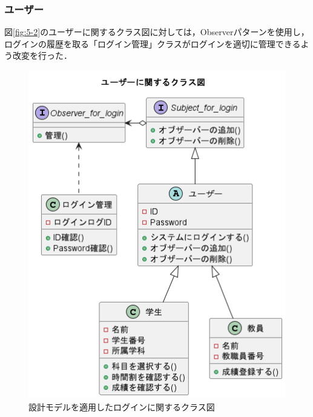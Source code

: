 \documentclass[documentclass]{jsarticle}
\begin{document}
\subsubsection*{ユーザー}
図\ref*{fig:5-2}のユーザーに関するクラス図に対しては，Observerパターンを使用し，ログインの履歴を取る「ログイン管理」クラスがログインを適切に管理できるよう改変を行った．
\begin{figure}[H]
  \begin{center}
    \includegraphics*[scale=0.4]{figure/9-2.png}
  \end{center}
  \caption{設計モデルを適用したログインに関するクラス図}
  \label{fig:9-2}
\end{figure}
\end{document}
